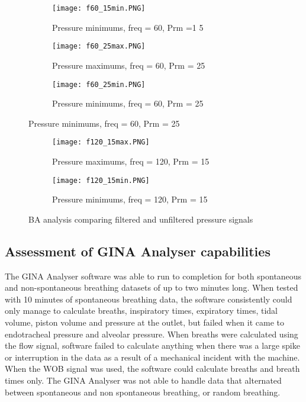 \documentclass[12pt, openany, oneside]{book}
\begin{document}
\begin{figure}[H]\ContinuedFloat
	\begin{subfigure}[H]{0.8\textwidth}
		\centering
		\texttt{[image: f60\_15min.PNG]}		
		\caption{Pressure minimums, freq = 60, Prm =1 5}
		\label{fig:f60_15min}
	\end{subfigure}
\hfill
\begin{subfigure}[H]{0.8\textwidth}
		\centering
		\texttt{[image: f60\_25max.PNG]}		
		\caption{Pressure maximums, freq = 60, Prm = 25}
		\label{fig:f60_25max}
	\end{subfigure}
	\hfill
	\begin{subfigure}[H]{0.8\textwidth}
		\centering
		\texttt{[image: f60\_25min.PNG]}		
		\caption{Pressure minimums, freq = 60, Prm = 25}
		\label{fig:f60_25min}
	\end{subfigure}
\end{figure}
\begin{figure}[H]\ContinuedFloat
\begin{subfigure}[H]{0.8\textwidth}
		\centering
		\texttt{[image: f120\_15max.PNG]}		
		\caption{Pressure maximums, freq = 120, Prm = 15}
		\label{fig:f120_15max}
	\end{subfigure}
\hfill
	\begin{subfigure}[H]{0.8\textwidth}
		\centering
		\texttt{[image: f120\_15min.PNG]}		
		\caption{Pressure minimums, freq = 120, Prm = 15}
		\label{fig:f120_15min}
	\end{subfigure}

\caption{BA analysis comparing filtered and unfiltered pressure signals}
\label{fig:balast}
	
\end{figure}


\subsection{Assessment of GINA Analyser capabilities}
The GINA Analyser software was able to run to completion for both spontaneous and non-spontaneous breathing datasets of up to two minutes long. When tested with 10 minutes of spontaneous breathing data, the software consistently could only manage to calculate breaths, inspiratory times, expiratory times, tidal volume, piston volume and pressure at the outlet, but failed when it came to endotracheal pressure and alveolar pressure. When breaths were calculated using the flow signal, software failed to calculate anything when there was a large spike or interruption in the data as a result of a mechanical incident with the machine. When the WOB signal was used, the software could calculate breaths and breath times only. The GINA Analyser was not able to handle data that alternated between spontaneous and non spontaneous breathing, or random breathing. \\
\end{document}
